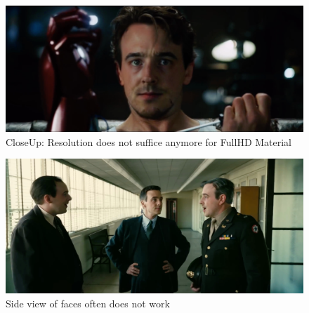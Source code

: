 \documentclass[
  a4paper,  %
  twoside,  %
  bibliography=totoc,
  headsepline,
  cleardoublepage=empty,
  parskip=half,
  draft=false
]{scrbook}
\begin{document}
\begin{figure}[h]
  \centering
  \includegraphics[width=1\textwidth]{./graphics/images/inswapper/iron-man-too-close.png}
  \caption{CloseUp: Resolution does not suffice anymore for FullHD Material}
\end{figure}
\begin{figure}[h]
  \centering
  \includegraphics[width=1\textwidth]{./graphics/images/inswapper/oppenheimer1.png}
  \caption{Side view of faces often does not work}
\end{figure}
\end{document}
